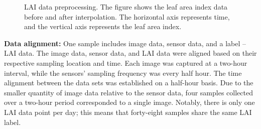 \documentclass[acmsmall,manuscript, screen, review]{acmart}
\begin{document}
\begin{figure}[htbp]
  \hfill
  \caption{LAI data preprocessing. The figure shows the leaf area index data before and after interpolation. The horizontal axis represents time, and the vertical axis represents the leaf area index.}
  \label{lai}
\end{figure}



\textbf{Data alignment:} One sample includes image data, sensor data, and a label -- LAI data. The image data, sensor data, and LAI data were aligned based on their respective sampling location and time. Each image was captured at a two-hour interval, while the sensors' sampling frequency was every half hour. The time alignment between the data sets was established on a half-hour basis. Due to the smaller quantity of image data relative to the sensor data, four samples collected over a two-hour period corresponded to a single image. Notably, there is only one LAI data point per day; this means that forty-eight samples share the same LAI label.
\end{document}
